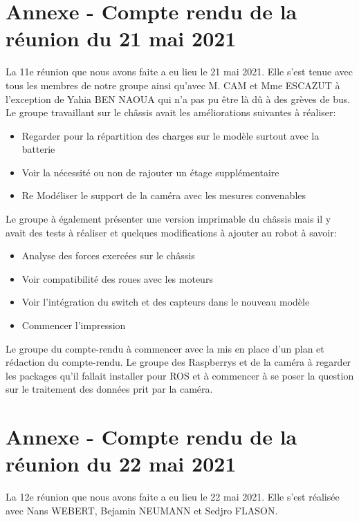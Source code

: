 \documentclass{PackagerQualityN}
\begin{document}
\newp
\section*{Annexe - Compte rendu de la réunion du 21 mai 2021}
La 11e réunion que nous avons faite a eu lieu le 21 mai 2021. Elle s'est tenue avec tous les membres de notre groupe ainsi qu'avec M. CAM et Mme ESCAZUT à l'exception de Yahia BEN NAOUA qui n'a pas pu être là dû à des grèves de bus.\\

Le groupe travaillant sur le châssis avait les améliorations suivantes à réaliser:

\begin{itemize}
    \item Regarder pour la répartition des charges sur le modèle surtout avec la batterie
    \item Voir la nécessité ou non de rajouter un étage supplémentaire 
    \item Re Modéliser le support de la caméra avec les mesures convenables\\
\end{itemize}

Le groupe à également présenter une version imprimable du châssis mais il y avait des tests à réaliser et quelques modifications à ajouter au robot à savoir:
\begin{itemize}
    \item Analyse des forces exercées sur le châssis
    \item Voir compatibilité des roues avec les moteurs
    \item Voir l'intégration du switch et des capteurs dans le nouveau modèle
    \item Commencer l’impression
\end{itemize}

Le groupe du compte-rendu à commencer avec la mis en place d’un plan et rédaction du compte-rendu.
Le groupe des Raspberrys et de la caméra à regarder les packages qu'il fallait installer pour ROS et à commencer à se poser la question sur le traitement des données prit par la caméra.

\newp
\section*{Annexe - Compte rendu de la réunion du 22 mai 2021}
La 12e réunion que nous avons faite a eu lieu le 22 mai 2021. Elle s'est réalisée avec Nans WEBERT, Bejamin NEUMANN et Sedjro FLASON.\\
\end{document}
